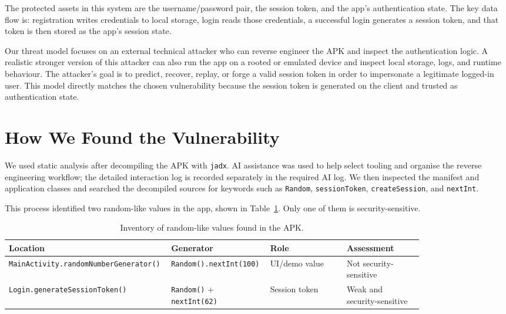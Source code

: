 \documentclass[letterpaper,twocolumn,10pt]{article}
\begin{document}
The protected assets in this system are the username/password pair, the session token, and the app's authentication state. The key data flow is: registration writes credentials to local storage, login reads those credentials, a successful login generates a session token, and that token is then stored as the app's session state.

Our threat model focuses on an external technical attacker who can reverse engineer the APK and inspect the authentication logic. A realistic stronger version of this attacker can also run the app on a rooted or emulated device and inspect local storage, logs, and runtime behaviour. The attacker's goal is to predict, recover, replay, or forge a valid session token in order to impersonate a legitimate logged-in user. This model directly matches the chosen vulnerability because the session token is generated on the client and trusted as authentication state.

\section{How We Found the Vulnerability}
We used static analysis after decompiling the APK with \texttt{jadx}. AI assistance was used to help select tooling and organise the reverse engineering workflow; the detailed interaction log is recorded separately in the required AI log. We then inspected the manifest and application classes and searched the decompiled sources for keywords such as \texttt{Random}, \texttt{sessionToken}, \texttt{createSession}, and \texttt{nextInt}.

This process identified two random-like values in the app, shown in Table~\ref{tab:inventory}. Only one of them is security-sensitive.

\begin{table}[t]
\centering
\small
\caption{Inventory of random-like values found in the APK.}
\label{tab:inventory}
\begin{tabular}{p{0.24\linewidth}p{0.22\linewidth}p{0.18\linewidth}p{0.18\linewidth}}
\toprule
\textbf{Location} & \textbf{Generator} & \textbf{Role} & \textbf{Assessment} \\
\midrule
\texttt{MainActivity.randomNumberGenerator()} & \texttt{Random().nextInt(100)} & UI/demo value & Not security-sensitive \\
\texttt{Login.generateSessionToken()} & \texttt{Random()} + \texttt{nextInt(62)} & Session token & Weak and security-sensitive \\
\bottomrule
\end{tabular}
\end{table}
\end{document}
